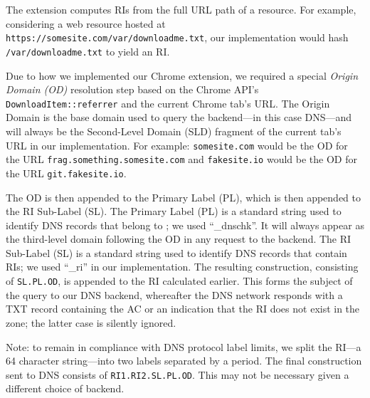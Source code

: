 The extension computes RIs from the full URL path of a resource. For example,
considering a web resource hosted at
\texttt{https://somesite.com/var/downloadme.txt}, our implementation would hash
\texttt{/var/downloadme.txt} to yield an RI.


Due to how we implemented our Chrome extension, we required a special
\emph{Origin Domain (OD)} resolution step based on the Chrome API's
\texttt{DownloadItem::referrer} and the current Chrome tab's URL. The Origin
Domain is the base domain used to query the backend---in this case DNS---and
will always be the Second-Level Domain (SLD) fragment of the current tab's URL
in our implementation. For example: \texttt{somesite.com} would be the OD for
the URL \texttt{frag.something.somesite.com} and \texttt{fakesite.io} would be
the OD for the URL \texttt{git.fakesite.io}.

The OD is then appended to the Primary Label (PL), which is then appended to the
RI Sub-Label (SL). The Primary Label (PL) is a standard string used to identify
DNS records that belong to \SYSTEM{}; we used ``\_dnschk''. It will always
appear as the third-level domain following the OD in any request to the backend. The
RI Sub-Label (SL) is a standard string used to identify DNS records that contain
RIs; we used ``\_ri'' in our implementation. The resulting construction,
consisting of \texttt{SL.PL.OD}, is appended to the RI calculated earlier. This
forms the subject of the query to our DNS backend, whereafter the DNS network
responds with a TXT record containing the AC or an indication that the RI does
not exist in the zone; the latter case is silently ignored.

Note: to remain in compliance with DNS protocol label limits, we split the
RI---a 64 character string---into two labels separated by a period. The final
construction sent to DNS consists of \texttt{RI1.RI2.SL.PL.OD}. This may not be
necessary given a different choice of backend.

